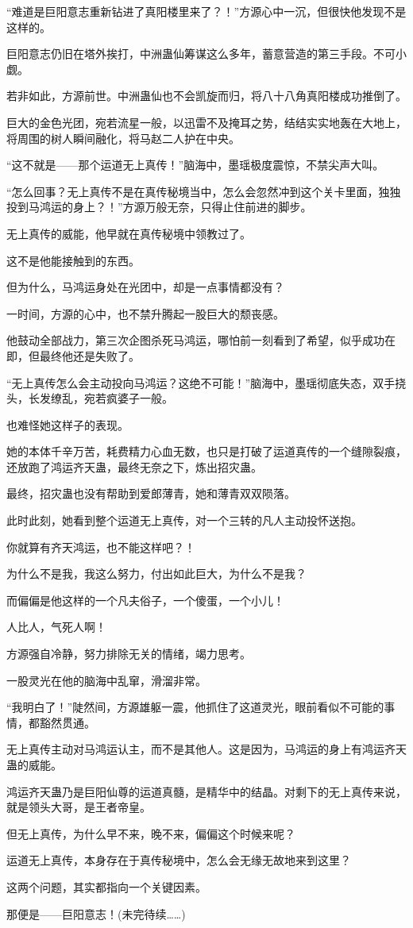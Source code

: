 \begin{this_body}
“难道是巨阳意志重新钻进了真阳楼里来了？！”方源心中一沉，但很快他发现不是这样的。

巨阳意志仍旧在塔外挨打，中洲蛊仙筹谋这么多年，蓄意营造的第三手段。不可小觑。

若非如此，方源前世。中洲蛊仙也不会凯旋而归，将八十八角真阳楼成功推倒了。

巨大的金色光团，宛若流星一般，以迅雷不及掩耳之势，结结实实地轰在大地上，将周围的树人瞬间融化，将马赵二人护在中央。

“这不就是——那个运道无上真传！”脑海中，墨瑶极度震惊，不禁尖声大叫。

“怎么回事？无上真传不是在真传秘境当中，怎么会忽然冲到这个关卡里面，独独投到马鸿运的身上？！”方源万般无奈，只得止住前进的脚步。

无上真传的威能，他早就在真传秘境中领教过了。

这不是他能接触到的东西。

但为什么，马鸿运身处在光团中，却是一点事情都没有？

一时间，方源的心中，也不禁升腾起一股巨大的颓丧感。

他鼓动全部战力，第三次企图杀死马鸿运，哪怕前一刻看到了希望，似乎成功在即，但最终他还是失败了。

“无上真传怎么会主动投向马鸿运？这绝不可能！”脑海中，墨瑶彻底失态，双手挠头，长发缭乱，宛若疯婆子一般。

也难怪她这样子的表现。

她的本体千辛万苦，耗费精力心血无数，也只是打破了运道真传的一个缝隙裂痕，还放跑了鸿运齐天蛊，最终无奈之下，炼出招灾蛊。

最终，招灾蛊也没有帮助到爱郎薄青，她和薄青双双陨落。

此时此刻，她看到整个运道无上真传，对一个三转的凡人主动投怀送抱。

你就算有齐天鸿运，也不能这样吧？！

为什么不是我，我这么努力，付出如此巨大，为什么不是我？

而偏偏是他这样的一个凡夫俗子，一个傻蛋，一个小儿！

人比人，气死人啊！

方源强自冷静，努力排除无关的情绪，竭力思考。

一股灵光在他的脑海中乱窜，滑溜非常。

“我明白了！”陡然间，方源雄躯一震，他抓住了这道灵光，眼前看似不可能的事情，都豁然贯通。

无上真传主动对马鸿运认主，而不是其他人。这是因为，马鸿运的身上有鸿运齐天蛊的威能。

鸿运齐天蛊乃是巨阳仙尊的运道真髓，是精华中的结晶。对剩下的无上真传来说，就是领头大哥，是王者帝皇。

但无上真传，为什么早不来，晚不来，偏偏这个时候来呢？

运道无上真传，本身存在于真传秘境中，怎么会无缘无故地来到这里？

这两个问题，其实都指向一个关键因素。

那便是——巨阳意志！(未完待续……)

\end{this_body}

